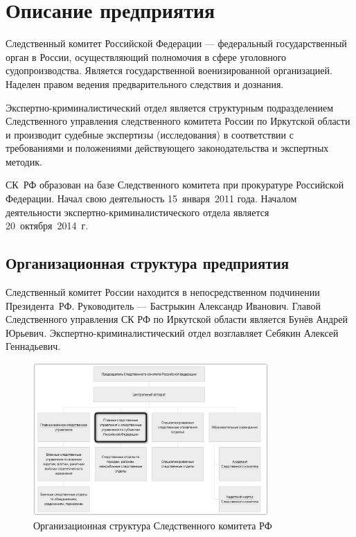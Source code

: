 \section{Описание предприятия}

Следственный комитет Российской Федерации --- федеральный государственный орган в России, осуществляющий полномочия в сфере уголовного судопроизводства. Является государственной военизированной организацией. Наделен правом ведения предварительного следствия и дознания.

Экспертно-криминалистический отдел является структурным подразделением Следственного управления следственного комитета России по Иркутской области и производит судебные экспертизы (исследования) в соответствии с требованиями и положениями действующего законодательства и экспертных методик.

СК~РФ образован на базе Следственного комитета при прокуратуре Российской Федерации\cite{order33}. Начал свою деятельность 15~января~2011 года. Началом деятельности экспертно-криминалистического отдела является 20~октября~2014~г.\cite{order71}

\subsection{Организационная структура предприятия}

Следственный комитет России находится в непосредственном подчинении Президента~РФ. Руководитель --- Бастрыкин Александр Иванович. Главой Следственного управления СК РФ по Иркутской области является Бунёв Андрей Юрьевич. Экспертно-криминалистический отдел возглавляет Себякин Алексей Геннадьевич.

\begin{figure}[H]
	\centering
	\includegraphics[width=0.8\textwidth]{pics/general_struct.png}
	\caption{Организационная структура Следственного комитета РФ}
\end{figure}

